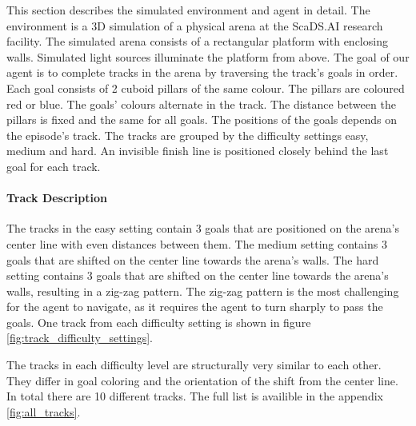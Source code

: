 This section describes the simulated environment and agent in detail. The environment is a 3D simulation of a physical arena at the ScaDS.AI research facility. The simulated arena consists of a rectangular platform with enclosing walls. Simulated light sources illuminate the platform from above.
The goal of our agent is to complete tracks in the arena by traversing the track's goals in order. Each goal consists of 2 cuboid pillars of the same colour. The pillars are coloured red or blue. The goals' colours alternate in the track. The distance between the pillars is fixed and the same for all goals. The positions of the goals depends on the episode's track. The tracks are grouped by the difficulty settings easy, medium and hard. An invisible finish line is positioned closely behind the last goal for each track.

\paragraph{Track Description}
The tracks in the easy setting contain 3 goals that are positioned on the arena's center line with even distances between them. The medium setting contains 3 goals that are shifted on the center line towards the arena's walls. The hard setting contains 3 goals that are shifted on the center line towards the arena's walls, resulting in a zig-zag pattern. The zig-zag pattern is the most challenging for the agent to navigate, as it requires the agent to turn sharply to pass the goals. One track from each difficulty setting is shown in figure \ref{fig:track_difficulty_settings}. 

The tracks in each difficulty level are structurally very similar to each other. They differ in goal coloring and the orientation of the shift from the center line. In total there are 10 different tracks. The full list is availible in the appendix \ref{fig:all_tracks}.

